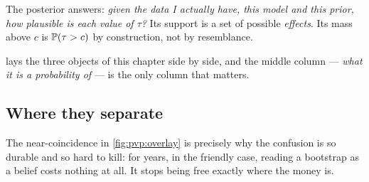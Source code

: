 The posterior answers: \emph{given the data I actually have, this model and this prior, how
plausible is each value of $\tau$?} Its support is a set of possible \emph{effects}. Its mass above
$c$ is $\operatorname{\mathbb{P}}(\tau > c)$ by construction, not by resemblance.

 lays the three objects of this chapter side by side, and the middle
column --- \emph{what it is a probability of} --- is the only column that matters.



\subsection*{Where they separate}

The near-coincidence in \cref{fig:pvp:overlay} is precisely why the confusion is so durable and so
hard to kill: for years, in the friendly case, reading a bootstrap as a belief costs nothing at
all. It stops being free exactly where the money is.

